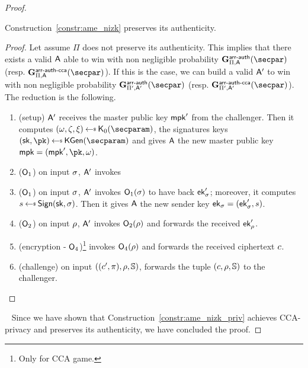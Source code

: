 \begin{proof}
    \begin{lemma}\label{lemma:ame_auth_same}
        Construction~\ref{constr:ame_nizk} preserves its authenticity.
        \begin{proof}
            Let assume $\Pi$ does not preserve its authenticity.
            This implies that there exists a valid $\mathsf{A}$ able to win with non negligible probability $\NISHeufgame{\arranged}_{\Pi, \adversary}(\secpar)$ (resp. $\NISHeufgamecca{\arranged}_{\Pi, \adversary}(\secpar)$).
            If this is the case, we can build a valid $\mathsf{A}'$ to win with non negligible probability $\NISHeufgame{\arranged}_{\Pi', \adversary'}(\secpar)$ (resp. $\NISHeufgamecca{\arranged}_{\Pi', \adversary'}(\secpar)$).
            The reduction is the following.

            \begin{enumerate}
                \item (setup) $\mathsf{A}'$ receives the master public key $\mathsf{mpk}'$ from the challenger. Then it computes $(\crs,\tpsim,\tpext)\getsr\nizkext_0(\secparam)$, the signatures keys $(\sk, \pk) \getsr \kgen(\secparam)$ and gives $\mathsf{A}$ the new master public key $\mpk = (\mpk', \pk, \crs)$.
                \item ($\mathsf{O}_1$) on input $\sigma$, $\mathsf{A}'$ invokes \item ($\mathsf{O}_1$) on input $\sigma$, $\mathsf{A}'$ invokes $\mathsf{O}_1(\sigma)$ to have back $\mathsf{ek}'_\sigma$; moreover, it computes $\signature \getsr \sign(\sk, \sattr)$. Then it gives $\mathsf{A}$ the new sender key $\mathsf{ek}_\sigma = (\mathsf{ek}'_\sigma, s)$.
                \item ($\mathsf{O}_2$) on input $\rho$, $\mathsf{A}'$ invokes $\mathsf{O}_2(\rho)$ and forwards the received $\mathsf{ek}'_\rho$.
                \item (encryption - $\mathsf{O}_4$)\footnote{Only for CCA game.} invokes $\mathsf{O}_4(\rho)$ and forwards the received ciphertext $c$.
                \item (challenge) on input $((c', \pi), \rho, \mathbb{S})$, forwards the tuple $(c, \rho, \mathbb{S})$ to the challenger.
            \end{enumerate}
        \end{proof}
    \end{lemma}
    ~\newline
    Since we have shown that Construction~\ref{constr:ame_nizk_priv} achieves CCA-privacy and preserves its authenticity, we have concluded the proof.
\end{proof}

